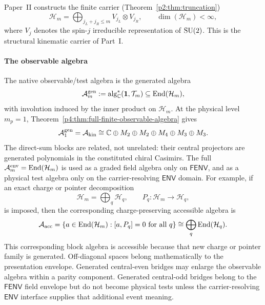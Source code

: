 \documentclass[12pt,a4paper]{article}
\begin{document}
Paper~II constructs the finite carrier (Theorem~\ref{p2:thm:truncation})
\begin{equation}
\label{p4:eq:part1-Hm}
\mathcal H_m
=
\bigoplus_{j_L+j_R\le m} V_{j_L}\otimes V_{j_R},
\qquad
\dim(\mathcal H_m)<\infty,
\end{equation}
where $V_j$ denotes the spin-$j$ irreducible representation of $\mathrm{SU}(2)$.
This is the structural kinematic carrier of Part~I.



\paragraph{The observable algebra}
\label{p4:sec:part1-native-algebra}

The native observable/test algebra is the generated algebra
\begin{equation}
\label{p4:eq:part1-Am}
\mathcal A_m^{\mathrm{gen}}
:=\operatorname{alg}_{\mathbb{C}}^{*}(\mathbf1,\mathcal T_m)
\subseteq\operatorname{End}(\mathcal H_m),
\end{equation}
with involution induced by the inner product on \(\mathcal H_m\).  At the
physical level \(m_p=1\), Theorem~\ref{p4:thm:full-finite-observable-algebra}
gives
\begin{equation}
\label{p4:eq:part1-Am-full-matrix}
\mathcal A_1^{\mathrm{gen}}=\mathcal A_{\rm kin}
\cong\mathbb{C}\oplus M_2\oplus M_2\oplus M_4\oplus M_3\oplus M_3.
\end{equation}
The direct-sum blocks are related, not unrelated: their central projectors are
generated polynomials in the constituted chiral Casimirs.  The full
\(\mathcal A_m^{\rm env}=\operatorname{End}(\mathcal H_m)\) is used as a graded field
algebra only on \(\mathsf{FENV}\), and as a physical test algebra only on the
carrier-resolving \(\mathsf{ENV}\) domain.
For example, if an exact charge or pointer decomposition
\begin{equation}
\label{p4:eq:part1-sector-Hm}
\mathcal H_m=\bigoplus_{q}\mathcal H_q,
\qquad P_q:\mathcal H_m\to\mathcal H_q,
\end{equation}
is imposed, then the corresponding charge-preserving accessible algebra is
\begin{equation}
\label{p4:eq:part1-accessible-blocks}
\mathcal A_{\mathrm{acc}}
=
\{a\in\operatorname{End}(\mathcal H_m):[a,P_q]=0\text{ for all }q\}
\cong
\bigoplus_q \operatorname{End}(\mathcal H_q).
\end{equation}
This corresponding block algebra is accessible because that new charge or
pointer family is generated.  Off-diagonal spaces belong mathematically to the
presentation envelope.  Generated central-even bridges may enlarge the
observable algebra within a parity component.  Generated central-odd bridges
belong to the \(\mathsf{FENV}\) field envelope but do not become physical
tests unless the carrier-resolving \(\mathsf{ENV}\) interface supplies that
additional event meaning.
\end{document}
